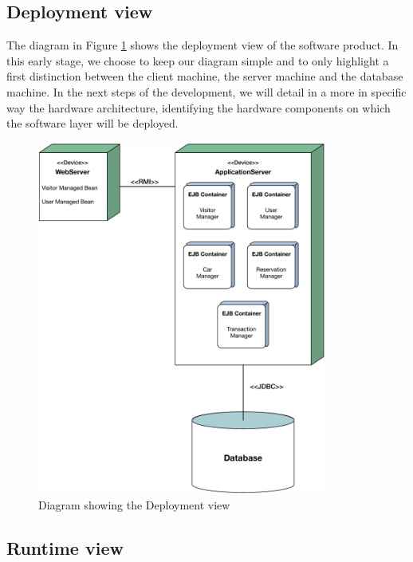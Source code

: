 \subsection{Deployment view} \label{subsec:depl-view}

The diagram in Figure \ref{fig:deployment} shows the deployment view of the software product. In this early stage, we choose to keep our diagram simple and to only highlight a first distinction between the client machine, the server machine and the database machine.
In the next steps of the development, we will detail in a more in specific way the hardware architecture, identifying the hardware components on which the software layer will be deployed.

\begin{figure}[htbp]
\centering
\vspace{12pt}
\includegraphics[width=0.85\textwidth]{Images/Deployment.pdf}
\vspace{10pt}
\caption{Diagram showing the Deployment view}
\label{fig:deployment}
\end{figure}
\clearpage

\subsection{Runtime view} \label{run-view}

